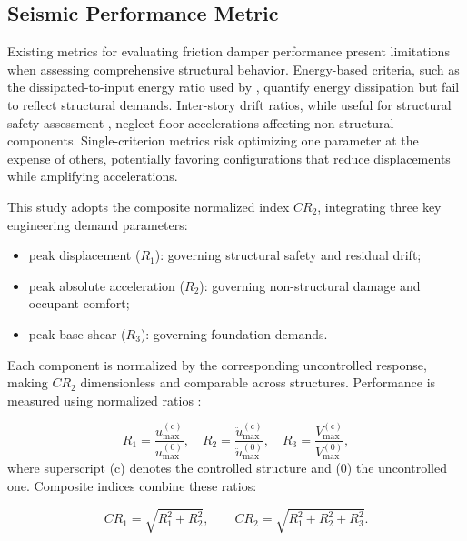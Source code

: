 \documentclass[preprint,12pt,authoryear]{elsarticle}
\begin{document}
\subsection{Seismic Performance Metric}
\label{sec:theory:metrica}

Existing metrics for evaluating friction damper performance present limitations when assessing comprehensive structural behavior. Energy-based criteria, such as the dissipated-to-input energy ratio used by \citet{Jarrahi2020jbe,Jarrahi2020sdee}, quantify energy dissipation but fail to reflect structural demands. Inter-story drift ratios, while useful for structural safety assessment \citep{chopra_dynamics_2015}, neglect floor accelerations affecting non-structural components. Single-criterion metrics risk optimizing one parameter at the expense of others, potentially favoring configurations that reduce displacements while amplifying accelerations.

This study adopts the composite normalized index $CR_2$, integrating three key engineering demand parameters:

\begin{itemize}
	\item peak displacement ($R_1$): governing structural safety and residual drift;
	\item peak absolute acceleration ($R_2$): governing non-structural damage and occupant comfort;
	\item peak base shear ($R_3$): governing foundation demands.
\end{itemize}

Each component is normalized by the corresponding uncontrolled response, making $CR_2$ dimensionless and comparable across structures. Performance is measured using normalized ratios \citep{Namorado2022,Jarrahi2020jbe,Mualla2002}:

\begin{equation}
	R_1 = \frac{u_{\max}^{(\mathrm{c})}}{u_{\max}^{(0)}}, \quad
	R_2 = \frac{\ddot{u}_{\max}^{(\mathrm{c})}}{\ddot{u}_{\max}^{(0)}}, \quad
	R_3 = \frac{V_{\max}^{(\mathrm{c})}}{V_{\max}^{(0)}},
	\label{eq:R_individual}
\end{equation}
where superscript (c) denotes the controlled structure and (0) the
uncontrolled one. Composite indices combine these ratios:

\begin{equation}
	CR_1 = \sqrt{R_1^2 + R_2^2}, \qquad
	CR_2 = \sqrt{R_1^2 + R_2^2 + R_3^2}.
	\label{eq:CR}
\end{equation}
\end{document}
